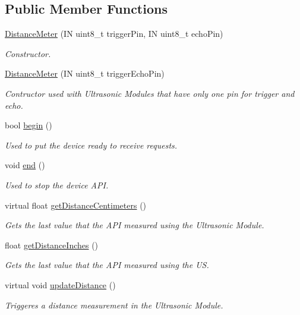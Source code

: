 \subsection*{Public Member Functions}
\begin{DoxyCompactItemize}
\item 
\hyperlink{class_easyuino_1_1_distance_meter_aad61ebf8398ba5cf6a80e5defc29bfcc}{Distance\+Meter} (IN uint8\+\_\+t trigger\+Pin, IN uint8\+\_\+t echo\+Pin)
\begin{DoxyCompactList}\small\item\em Constructor. \end{DoxyCompactList}\item 
\hyperlink{class_easyuino_1_1_distance_meter_aa5551cc3c42fe77f0972a41acf896cf9}{Distance\+Meter} (IN uint8\+\_\+t trigger\+Echo\+Pin)
\begin{DoxyCompactList}\small\item\em Contructor used with Ultrasonic Modules that have only one pin for trigger and echo. \end{DoxyCompactList}\item 
bool \hyperlink{class_easyuino_1_1_distance_meter_a0374e6f806cd71f0f918c6ea7b7700a0}{begin} ()
\begin{DoxyCompactList}\small\item\em Used to put the device ready to receive requests. \end{DoxyCompactList}\item 
void \hyperlink{class_easyuino_1_1_distance_meter_a8a818cc922418ae5a078193dbfab1e6b}{end} ()
\begin{DoxyCompactList}\small\item\em Used to stop the device A\+PI. \end{DoxyCompactList}\item 
virtual float \hyperlink{class_easyuino_1_1_distance_meter_a637cdd0d3e4f3bcf094704ae91e0c7c3}{get\+Distance\+Centimeters} ()
\begin{DoxyCompactList}\small\item\em Gets the last value that the A\+PI measured using the Ultrasonic Module. \end{DoxyCompactList}\item 
float \hyperlink{class_easyuino_1_1_distance_meter_a4e3c650c54382d9af6bca51dcac4e7a3}{get\+Distance\+Inches} ()
\begin{DoxyCompactList}\small\item\em Gets the last value that the A\+PI measured using the US. \end{DoxyCompactList}\item 
virtual void \hyperlink{class_easyuino_1_1_distance_meter_a739197578f06b58faedefd0526d49499}{update\+Distance} ()
\begin{DoxyCompactList}\small\item\em Triggeres a distance measurement in the Ultrasonic Module. \end{DoxyCompactList}\end{DoxyCompactItemize}
